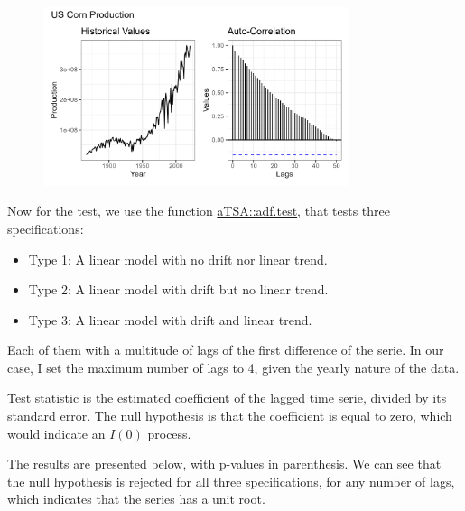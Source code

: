 \documentclass[12pt]{article}
\begin{document}
\begin{figure}[H]
    \centering
    \includegraphics[width=0.8\textwidth]{figures/corn_prod.png}
\end{figure}

Now for the test, we use the function \href{https://rdrr.io/cran/aTSA/man/adf.test.html}{aTSA::adf.test}, that tests three specifications:

\begin{itemize}
    \item Type 1: A linear model with no drift nor linear trend.
    \item Type 2: A linear model with drift but no linear trend.
    \item Type 3: A linear model with drift and linear trend.
\end{itemize}

Each of them with a multitude of lags of the first difference of the serie. In our case, I set the maximum number of lags to 4, given the yearly nature of the data.

Test statistic is the estimated coefficient of the lagged time serie, divided by its standard error. The null hypothesis is that the coefficient is equal to zero, which would indicate an $I(0)$ process.

The results are presented below, with p-values in parenthesis. We can see that the null hypothesis is rejected for all three specifications, for any number of lags, which indicates that the series has a unit root.


\end{document}
